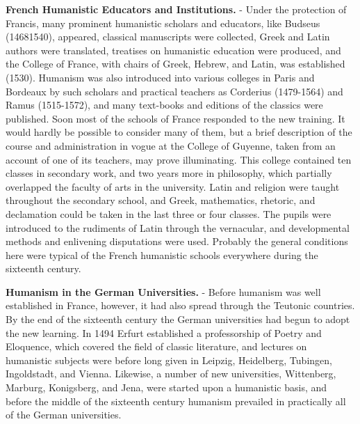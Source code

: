\documentclass[]{book}
\begin{document}
\textbf{French Humanistic Educators and Institutions.} - Under the protection of Francis, many prominent humanistic scholars and educators, like Budseus (14681540), appeared, classical manuscripts were collected, Greek and Latin authors were translated, treatises on humanistic education were produced, and the College of France, with chairs of Greek, Hebrew, and Latin, was established (1530). Humanism was also introduced into various colleges in Paris and Bordeaux by such scholars and practical teachers as Corderius (1479-1564) and Ramus (1515-1572), and many text-books and editions of the classics were published. Soon most of the schools of France responded to the new training. It would hardly be possible to consider many of them, but a brief description of the course and administration in vogue at the College of Guyenne, taken from an account of one of its teachers, may prove illuminating. This college contained ten classes in secondary work, and two years more in philosophy, which partially overlapped the faculty of arts in the university. Latin and religion were taught throughout the secondary school, and Greek, mathematics, rhetoric, and declamation could be taken in the last three or four classes. The pupils were introduced to the rudiments of Latin through the vernacular, and developmental methods and enlivening disputations were used. Probably the general conditions here were typical of the French humanistic schools everywhere during the sixteenth century.

\textbf{Humanism in the German Universities.} - Before humanism was well established in France, however, it had also spread through the Teutonic countries. By the end of the sixteenth century the German universities had begun to adopt the new learning. In 1494 Erfurt established a professorship of Poetry and Eloquence, which covered the field of classic literature, and lectures on humanistic subjects were before long given in Leipzig, Heidelberg, Tubingen, Ingoldstadt, and Vienna. Likewise, a number of new universities, Wittenberg, Marburg, Konigsberg, and Jena, were started upon a humanistic basis, and before the middle of the sixteenth century humanism prevailed in practically all of the German universities.
\end{document}
